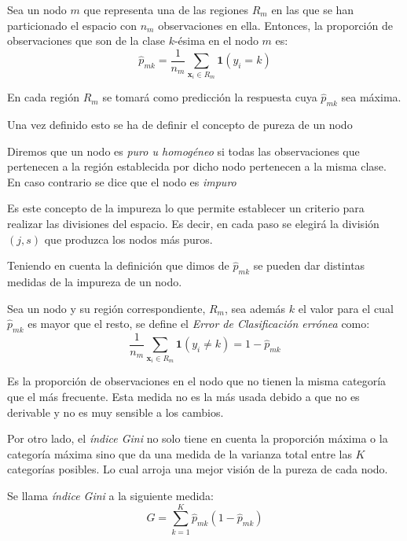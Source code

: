 \noindent Sea un nodo $m$ que representa una de las regiones $R_m$ en las que se han particionado el espacio con $n_m$ observaciones en ella. Entonces, la proporción de observaciones que son de la clase $k$-ésima en el nodo $m$ es:
\begin{equation}
\hat{p}_{mk}=\dfrac{1}{n_m}\sum_{\textbf{x}_i \in R_m}\mathbf{1}(y_i=k)
\end{equation}

\noindent En cada región $R_m$ se tomará como predicción la respuesta cuya $\hat{p}_{mk}$ sea máxima. 

\noindent Una vez definido esto se ha de definir el concepto de pureza de un nodo
\begin{defi}
Diremos que un nodo es \textit{puro u homogéneo} si todas las observaciones que pertenecen a la región establecida por dicho nodo pertenecen a la misma clase. En caso contrario se dice que el nodo es \textit{impuro}
\end{defi}

\noindent Es este concepto de la impureza lo que  permite establecer un criterio para realizar las divisiones del espacio. Es decir, en cada paso se elegirá la división $(j,s)$ que produzca los nodos más puros. 

\noindent Teniendo en cuenta la definición que dimos de $\hat{p}_{mk}$ se pueden dar distintas medidas de la impureza de un nodo. 

\begin{defi}
\noindent Sea un nodo y su región correspondiente, $R_m$, sea además $k$ el valor para el cual $\hat{p}_{mk}$ es mayor que el resto, se define el \textit{Error de Clasificación errónea} como:
\begin{equation}
\dfrac{1}{n_m}\sum_{\textbf{x}_i\in R_m}\mathbf{1}(y_i\neq k)=1-\hat{p}_{mk}
\end{equation}
\end{defi}
\noindent Es la proporción de observaciones en el nodo que no tienen la misma categoría que el más frecuente.
Esta medida no es la más usada debido a que no es derivable y no es muy sensible a los cambios.  

\noindent Por otro lado, el \textit{índice Gini} no solo tiene en cuenta la proporción máxima o la categoría máxima sino que da una medida de la varianza total entre las $K$ categorías posibles. Lo cual arroja una mejor visión de la pureza de cada nodo. 
\begin{defi}
Se llama \textit{índice Gini} a la siguiente medida:
\begin{equation}
G=\sum_{k=1}^K \hat{p}_{mk}(1-\hat{p}_{mk})
\end{equation}
\end{defi}

